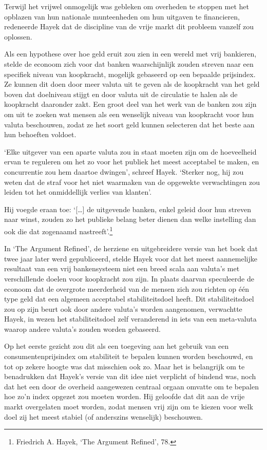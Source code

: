 \documentclass[smalldemyvopaper,11pt,twoside,onecolumn,openright,extrafontsizes,hidelinks]{memoir}
\begin{document}
Terwijl het vrijwel onmogelijk was gebleken om overheden te stoppen met
het opblazen van hun nationale munteenheden om hun uitgaven te
financieren, redeneerde Hayek dat de discipline van de vrije markt dit
probleem vanzelf zou oplossen.

Als een hypothese over hoe geld eruit zou zien in een wereld met vrij
bankieren, stelde de econoom zich voor dat banken waarschijnlijk zouden
streven naar een specifiek niveau van koopkracht, mogelijk gebaseerd op
een bepaalde prijsindex. Ze kunnen dit doen door meer valuta uit te
geven als de koopkracht van het geld boven dat doelniveau stijgt en door
valuta uit de circulatie te halen als de koopkracht daaronder zakt. Een
groot deel van het werk van de banken zou zijn om uit te zoeken wat
mensen als een wenselijk niveau van koopkracht voor hun valuta
beschouwen, zodat ze het soort geld kunnen selecteren dat het beste aan
hun behoeften voldoet.

`Elke uitgever van een aparte valuta zou in staat moeten zijn om de
hoeveelheid ervan te reguleren om het zo voor het publiek het meest
acceptabel te maken, en concurrentie zou hem daartoe dwingen', schreef
Hayek. `Sterker nog, hij zou weten dat de straf voor het niet waarmaken
van de opgewekte verwachtingen zou leiden tot het onmiddellijk verlies
van klanten'.

Hij voegde eraan toe: `{[}\ldots{]} de uitgevende banken, enkel geleid
door hun streven naar winst, zouden zo het publieke belang beter dienen
dan welke instelling dan ook die dat zogenaamd nastreeft'.\footnote{Friedrich
  A. Hayek, `The Argument Refined', 78.}

In `The Argument Refined', de herziene en uitgebreidere versie van het
boek dat twee jaar later werd gepubliceerd, stelde Hayek voor dat het
meest aannemelijke resultaat van een vrij bankensysteem niet een breed
scala aan valuta's met verschillende doelen voor koopkracht zou zijn. In
plaats daarvan speculeerde de econoom dat de overgrote meerderheid van
de mensen zich zou richten op één type geld dat een algemeen acceptabel
stabiliteitsdoel heeft. Dit stabiliteitsdoel zou op zijn beurt ook door
andere valuta's worden aangenomen, verwachtte Hayek, in wezen het
stabiliteitsdoel zelf veranderend in iets van een meta-valuta waarop
andere valuta's zouden worden gebaseerd.

Op het eerste gezicht zou dit als een toegeving aan het gebruik van een
consumentenprijsindex om stabiliteit te bepalen kunnen worden beschouwd,
en tot op zekere hoogte was dat misschien ook zo. Maar het is belangrijk
om te benadrukken dat Hayek's versie van dit idee niet verplicht of
bindend was, noch dat het een door de overheid aangewezen centraal
orgaan omvatte om te bepalen hoe zo'n index opgezet zou moeten worden.
Hij geloofde dat dit aan de vrije markt overgelaten moet worden, zodat
mensen vrij zijn om te kiezen voor welk doel zij het meest stabiel (of
anderszins wenselijk) beschouwen.
\end{document}
